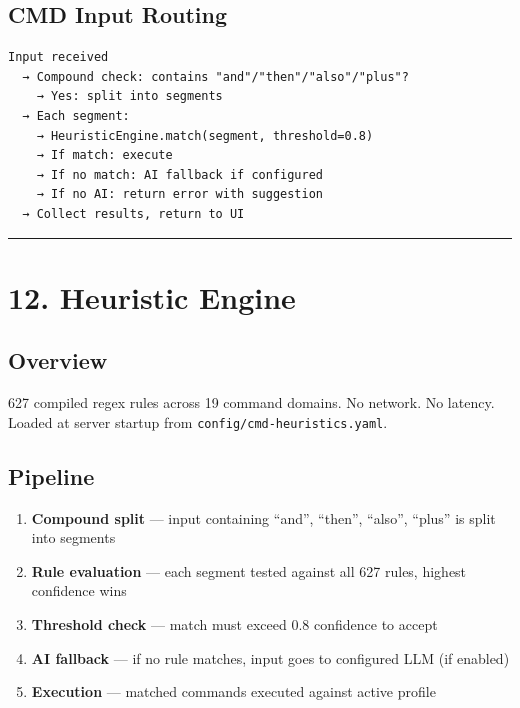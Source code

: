 \documentclass[
]{article}
\providecommand{\tightlist}{%
  \setlength{\itemsep}{0pt}\setlength{\parskip}{0pt}}
\begin{document}
\subsection{CMD Input Routing}\label{cmd-input-routing}

\begin{verbatim}
Input received
  → Compound check: contains "and"/"then"/"also"/"plus"?
    → Yes: split into segments
  → Each segment:
    → HeuristicEngine.match(segment, threshold=0.8)
    → If match: execute
    → If no match: AI fallback if configured
    → If no AI: return error with suggestion
  → Collect results, return to UI
\end{verbatim}

\begin{center}\rule{0.5\linewidth}{0.5pt}\end{center}

\section{12. Heuristic Engine}\label{heuristic-engine}

\subsection{Overview}\label{overview-2}

627 compiled regex rules across 19 command domains. No network. No
latency. Loaded at server startup from
\texttt{config/cmd-heuristics.yaml}.

\subsection{Pipeline}\label{pipeline}

\begin{enumerate}
\def\labelenumi{\arabic{enumi}.}
\tightlist
\item
  \textbf{Compound split} --- input containing ``and'', ``then'',
  ``also'', ``plus'' is split into segments
\item
  \textbf{Rule evaluation} --- each segment tested against all 627
  rules, highest confidence wins
\item
  \textbf{Threshold check} --- match must exceed 0.8 confidence to
  accept
\item
  \textbf{AI fallback} --- if no rule matches, input goes to configured
  LLM (if enabled)
\item
  \textbf{Execution} --- matched commands executed against active
  profile
\end{enumerate}
\end{document}
